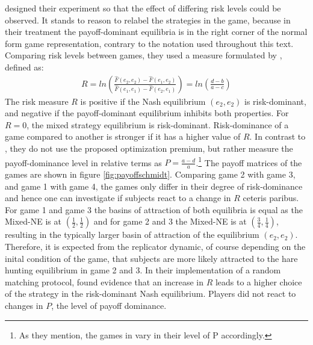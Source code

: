\textcite{schmidt_playing_2003} designed their experiment so that the effect
of differing risk levels could be observed. It stands to reason to relabel 
the strategies in the game, because in their treatment the payoff-dominant 
equilibria is in the right corner of the normal form game representation,
contrary to the notation used throughout this text. Comparing risk levels between
games, they used a measure formulated by \textcite{selten_axiomatic_1995}, 
defined
as:
\begin{align}
        \label{riskmeasureschmidt}
        R = ln\left(\frac{\hat{F}(e_2,e_2) -\hat{F}(e_1,e_2)}{\hat{F}(e_1,e_1) 
        -\hat{F}(e_2,e_1)}\right) = ln \left(\frac{d-b}{a-c}\right)
\end{align}
The risk measure $R$ is positive if the Nash equilibrium $(e_2,e_2)$ is
risk-dominant, and negative if the payoff-dominant equilibrium inhibits both
properties. For $R=0$, the mixed strategy equilibrium is risk-dominant.
Risk-dominance of a game compared to another is stronger 
if it has a higher value of $R$.
In contrast to \textcite{battalio_optimization_2001}, they do not
use the proposed optimization premium, but rather measure the 
payoff-dominance level in relative terms 
as $P=\frac{a-d}{a}$.\footnote{As they mention, the 
games in \textcite{battalio_optimization_2001} vary in their level of 
P accordingly.}
The payoff matrices of the games are shown in figure \ref{fig:payoffschmidt}.
Comparing game 2 with game 3, and game 1 with game 4, the games
only differ in their degree of risk-dominance and hence one can 
investigate if subjects react to a change in $R$ ceteris paribus. 
For game 1 and game 3 the basins of attraction of both equilibria is equal as
the Mixed-NE is at $(\frac 12, \frac 12)$ and  for
game 2 and 3 the Mixed-NE is at $(\frac 34,\frac 14)$, resulting in the 
typically larger basin of attraction of the equilibrium $(e_2,e_2)$. 
Therefore, it is expected from the replicator dynamic, of course 
depending on the inital condition 
of the game, that subjects are more likely attracted to the hare hunting 
equilibrium in game 2 and 3. In their implementation of a 
random matching protocol, \textcite{schmidt_playing_2003} 
found evidence that an increase in $R$ leads to a higher choice 
of the strategy in the risk-dominant Nash equilibrium. Players did not react 
to changes in $P$, the level of payoff dominance.


